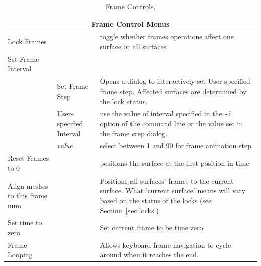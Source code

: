 \begin{table}[ht]
\caption{Frame Controls.}
  \begin{center}
    \begin{tabular}{|l|l|p{2.8 in}|} \hline
      \multicolumn{3}{|c|}{\textbf{Frame Control Menus}} \\ \hline
    Lock Frames  & & toggle whether frames 
        operations affect one surface or all surfaces \\ \hline
    Set Frame Interval & & \\
      & Set Frame Step & Opens a dialog to interactively set User-specified 
    frame step.  Affected surfaces are determined by the lock status.\\
      & User-specified Interval & use the value of interval specified in the 
        \texttt{-i} option of the command line or the value set in the
        frame step dialog.\\ 
      & \emph{value} & select between 1 and 90 for frame animation step \\
    Reset Frames to 0 & & positions the surface at the first position in time
       \\
    Align meshes to this frame num & & Positions all surfaces' frames to the
    current surface.  What 'current surface' means will vary based on the status
    of the locks (see Section~\ref{sec:locks})
    \\
    Set time to zero & & Set current frame to be time zero.
        \\ \hline
    Frame Looping & & Allows keyboard frame navigation to cycle around when it reaches the end.
        \\ 
    \end{tabular}
  \end{center}
\end{table}

